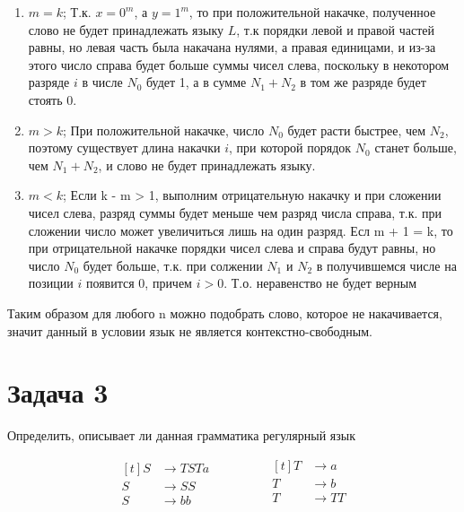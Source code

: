 \documentclass[a4paper, 14pt]{article}
\begin{document}
\begin{enumerate}
{    \begin{enumerate}
		\item{ $m = k$; Т.к. $x = 0^m$, а $y = 1^m$, то при положительной накачке, полученное слово не будет принадлежать языку $L$, т.к порядки левой и правой частей равны,
			но левая часть была накачана нулями, а правая единицами, и из-за этого число справа будет больше суммы чисел слева, поскольку в некотором разряде $i$ в числе $N_0$ будет 1, а в сумме $N_1 + N_2$ в том же разряде будет стоять 0. 
			} 
		\item{ $m > k$; При положительной накачке, число $N_0$ будет расти быстрее, чем $N_2$, поэтому существует длина накачки $i$, при которой порядок $N_0$ станет больше, чем $N_1 + N_2$, и слово не будет принадлежать языку.} 
		\item{ $m < k$; Если k - m > 1, выполним отрицательную накачку и при сложении чисел слева, разряд суммы будет меньше чем разряд числа справа, т.к. при сложении число может увеличиться лишь на один разряд. Есл m + 1 = k, то при отрицательной накачке порядки чисел слева и справа будут равны, но число $N_0$ будет больше, т.к. при солжении $N_1$ и $N_2$ в получившемся числе на позиции $i$ появится 0, причем $i > 0$. Т.о. неравенство не будет верным} 
    \end{enumerate}
		}
\end{enumerate}

Таким образом для любого n можно подобрать слово, которое не накачивается, значит данный в условии язык не является контекстно-свободным.


\newpage 

\section{Задача 3}

Определить, описывает ли данная грамматика регулярный язык 

\begin{equation*}
	\begin{aligned}[t]
		S &\rightarrow TSTa\\  
		S &\rightarrow SS\\
		S &\rightarrow bb
	\end{aligned}
	\qquad \ \qquad
	\begin{aligned}[t]
		T &\rightarrow a\\
		T &\rightarrow b\\
		T &\rightarrow TT\\
	\end{aligned}
\end{equation*}
\end{document}
